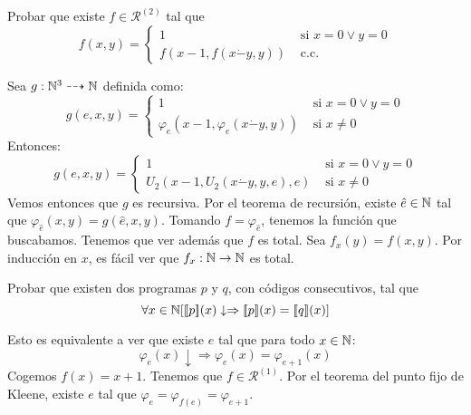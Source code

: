 \documentclass[twoside]{article}
\begin{document}
\newpage

\begin{ejercicio}{18}
Probar que existe $f \in \mathcal{R}^{(2)}$ tal que
\[ f(x,y) = \begin{cases}
	1 &\text{ si }x = 0 \lor y = 0\\
	f(x-1, f(x\dot{-}y,y)) &\text{ c.c.}	
\end{cases}\]
\end{ejercicio}
\begin{solucion}
Sea $g : \mathbb{N}^3 \dashrightarrow \mathbb{N}$ definida como:
\[ g(e,x,y) = \begin{cases}
	1 &\text{ si }x = 0 \lor y = 0\\
	φ_e(x-1,φ_e(x\dot{-}y,y)) & \text{ si }x \neq 0
\end{cases}\]
Entonces:
\[ g(e,x,y) = \begin{cases}
	1 &\text{ si }x = 0 \lor y = 0\\
	U_2(x-1,U_2(x\dot{-}y,y,e),e) & \text{ si }x \neq 0
\end{cases}\]
Vemos entonces que $g$ es recursiva. Por el teorema de recursión, existe $\hat{e} \in \mathbb{N}$ tal que $φ_{\hat{e}} (x,y) = g(\hat{e},x,y)$. Tomando $f = φ_{\hat{e}}$, tenemos la función que buscabamos. Tenemos que ver además que $f$ es total. Sea $f_x(y) = f(x,y)$. Por inducción en $x$, es fácil ver que $f_x : \mathbb{N} \to \mathbb{N}$ es total.
\end{solucion}
\newpage

\begin{ejercicio}{20}
Probar que existen dos programas $p$ y $q$, con códigos consecutivos, tal que
\[ \forall x \in \mathbb{N} [ [\![p]\!](x) \downarrow \Rightarrow [\![p]\!](x) = [\![q]\!](x)]\]
\end{ejercicio}
\begin{solucion}
Esto es equivalente a ver que existe $e$ tal que para todo $x \in \mathbb{N}$:
\[ φ_e(x) \downarrow \Rightarrow φ_e(x)=φ_{e+1}(x) \]
Cogemos $f(x)=x+1$. Tenemos que $f \in \mathcal{R}^{(1)}$. Por el teorema del punto fijo de Kleene, existe $e$ tal que $φ_e = φ_{f(e)} = φ_{e+1}$.
\end{solucion}
\end{document}
